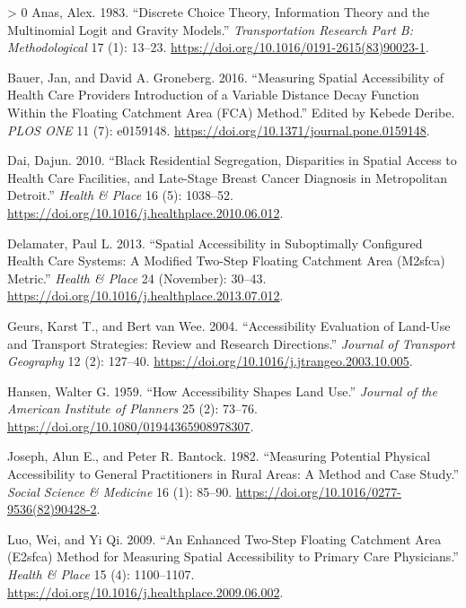 \documentclass{article}
\newlength{\cslhangindent}
\newenvironment{CSLReferences}[3] %
 {%
  \setlength{\parindent}{0pt}
  \ifodd #1 \everypar{\setlength{\hangindent}{\cslhangindent}}\ignorespaces\fi
  \ifnum #2 > 0
  \setlength{\parskip}{#2\baselineskip}
  \fi
 }%
 {}
\begin{document}
\hypertarget{refs}{}
\begin{CSLReferences}{1}{0}
\leavevmode\hypertarget{ref-anas1983}{}%
Anas, Alex. 1983. {``Discrete Choice Theory, Information Theory and the
Multinomial Logit and Gravity Models.''} \emph{Transportation Research
Part B: Methodological} 17 (1): 13--23.
\url{https://doi.org/10.1016/0191-2615(83)90023-1}.

\leavevmode\hypertarget{ref-bauer2016}{}%
Bauer, Jan, and David A. Groneberg. 2016. {``Measuring Spatial
Accessibility of Health Care Providers {{}} Introduction of a Variable
Distance Decay Function Within the Floating Catchment Area (FCA)
Method.''} Edited by Kebede Deribe. \emph{PLOS ONE} 11 (7): e0159148.
\url{https://doi.org/10.1371/journal.pone.0159148}.

\leavevmode\hypertarget{ref-dai2010}{}%
Dai, Dajun. 2010. {``Black Residential Segregation, Disparities in
Spatial Access to Health Care Facilities, and Late-Stage Breast Cancer
Diagnosis in Metropolitan Detroit.''} \emph{Health \& Place} 16 (5):
1038--52. \url{https://doi.org/10.1016/j.healthplace.2010.06.012}.

\leavevmode\hypertarget{ref-delamater2013}{}%
Delamater, Paul L. 2013. {``Spatial Accessibility in Suboptimally
Configured Health Care Systems: A Modified Two-Step Floating Catchment
Area (M2sfca) Metric.''} \emph{Health \& Place} 24 (November): 30--43.
\url{https://doi.org/10.1016/j.healthplace.2013.07.012}.

\leavevmode\hypertarget{ref-geurs2004}{}%
Geurs, Karst T., and Bert van Wee. 2004. {``Accessibility Evaluation of
Land-Use and Transport Strategies: Review and Research Directions.''}
\emph{Journal of Transport Geography} 12 (2): 127--40.
\url{https://doi.org/10.1016/j.jtrangeo.2003.10.005}.

\leavevmode\hypertarget{ref-hansen1959}{}%
Hansen, Walter G. 1959. {``How Accessibility Shapes Land Use.''}
\emph{Journal of the American Institute of Planners} 25 (2): 73--76.
\url{https://doi.org/10.1080/01944365908978307}.

\leavevmode\hypertarget{ref-joseph1982}{}%
Joseph, Alun E., and Peter R. Bantock. 1982. {``Measuring Potential
Physical Accessibility to General Practitioners in Rural Areas: A Method
and Case Study.''} \emph{Social Science \& Medicine} 16 (1): 85--90.
\url{https://doi.org/10.1016/0277-9536(82)90428-2}.

\leavevmode\hypertarget{ref-luo2009}{}%
Luo, Wei, and Yi Qi. 2009. {``An Enhanced Two-Step Floating Catchment
Area (E2sfca) Method for Measuring Spatial Accessibility to Primary Care
Physicians.''} \emph{Health \& Place} 15 (4): 1100--1107.
\url{https://doi.org/10.1016/j.healthplace.2009.06.002}.


\end{CSLReferences}
\end{document}
